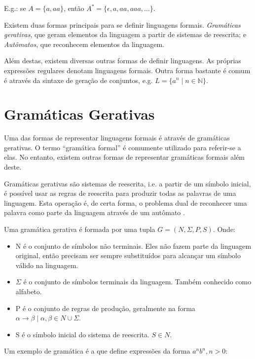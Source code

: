 \documentclass[a4paper,12pt,oneside,onecolumn]{uerj}
\begin{document}
E.g.: se $A = \{a, aa\}$, então $A^* = \{\epsilon, a, aa, aaa, \ldots\}$.

Existem duas formas principais para se definir linguagens formais. \emph{Gramáticas gerativas}, que geram elementos da linguagem a partir de sistemas de reescrita; e \emph{Autômatos}, que reconhecem elementos da linguagem. 

Além destas, existem diversas outras formas de definir linguagens. As próprias expressões regulares denotam linguagens formais. Outra forma bastante é comum é através da sintaxe de geração de conjuntos, e.g. $L=\{a^n \mid n \in \mathbb{N}\}$.

\section{Gramáticas Gerativas}

Uma das formas de representar linguagens formais é através de gramáticas gerativas. O termo ``gramática formal'' é comumente utilizado para referir-se a elas. No entanto, existem outras formas de representar gramáticas formais além deste.

Gramáticas gerativas são sistemas de reescrita, i.e. a partir de um símbolo inicial, é possível usar as regras de reescrita para produzir todas as palavras de uma linguagem. Esta operação é, de certa forma, o problema dual de reconhecer uma palavra como parte da linguagem através de um autômato \cite{bib:Ruohonen09}.

Uma gramática gerativa é formada por uma tupla $G = (N, \Sigma, P, S)$. Onde:

\begin{itemize}
    \item N é o conjunto de símbolos não terminais. Eles não fazem parte da linguagem original, então precisam ser sempre substituídos para alcançar um símbolo válido na linguagem.
    \item $\Sigma$ é o conjunto de símbolos terminais da linguagem. Também conhecido como alfabeto.
    \item P é o conjunto de regras de produção, geralmente na forma $\alpha \rightarrow \beta \mid \alpha, \beta \in N \cup \Sigma$.
    \item S é o símbolo inicial do sistema de reescrita. $S \in N$.
\end{itemize}

Um exemplo de gramática é a que define expressões da forma $a^nb^n, n>0$:
\end{document}
